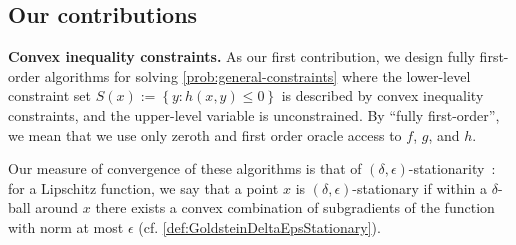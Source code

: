 \subsection{Our contributions}\label{sec:introduction_main_results}
\begin{description}[style=unboxed,leftmargin=0cm, itemsep=.5em, parsep=.3em, topsep=.5em]
\item [{(1)}] \textbf{Convex inequality constraints.} As our first contribution, we design fully first-order algorithms for solving \cref{prob:general-constraints} where the lower-level constraint set $S(x):=\left\{y:h(x,y)\leq0\right\}$  is described by convex inequality constraints, and the upper-level variable is unconstrained. 
By ``fully first-order'', we mean that we use only zeroth and first order oracle access to $f$, $g$, and $h$. 


Our measure of convergence of these algorithms is that of $(\delta,\epsilon)$-stationarity~\cite{goldstein1977optimization}: for a Lipschitz function, we say that a point $x$ is $(\delta,\epsilon)$-stationary if within a $\delta$-ball around $x$ there exists a convex combination of subgradients of the function with norm at most $\epsilon$ (cf. \cref{def:GoldsteinDeltaEpsStationary}). 


\end{description}
